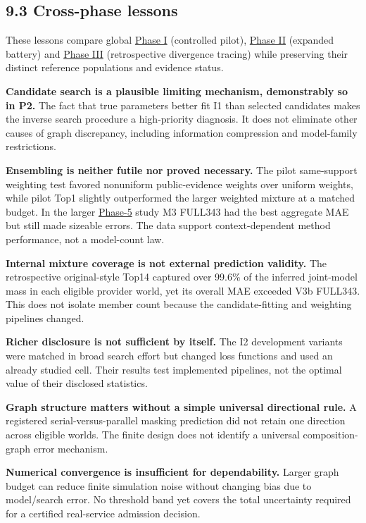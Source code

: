 \documentclass[10pt,a4paper]{article}
\begin{document}
\subsection*{9.3 Cross-phase lessons}

These lessons compare global \hyperref[app:experiment-stages]{Phase I} (controlled pilot), \hyperref[app:experiment-stages]{Phase II} (expanded battery) and \hyperref[app:experiment-stages]{Phase III} (retrospective divergence tracing) while preserving their distinct reference populations and evidence status.

\textbf{Candidate search is a plausible limiting mechanism, demonstrably so in P2.} The fact that true parameters better fit I1 than selected candidates makes the inverse search procedure a high-priority diagnosis. It does not eliminate other causes of graph discrepancy, including information compression and model-family restrictions.

\textbf{Ensembling is neither futile nor proved necessary.} The pilot same-support weighting test favored nonuniform public-evidence weights over uniform weights, while pilot Top1 slightly outperformed the larger weighted mixture at a matched budget. In the larger \hyperref[app:experiment-stages]{Phase-5} study M3 FULL343 had the best aggregate MAE but still made sizeable errors. The data support context-dependent method performance, not a model-count law.

\textbf{Internal mixture coverage is not external prediction validity.} The retrospective original-style Top14 captured over 99.6\% of the inferred joint-model mass in each eligible provider world, yet its overall MAE exceeded V3b FULL343. This does not isolate member count because the candidate-fitting and weighting pipelines changed.

\textbf{Richer disclosure is not sufficient by itself.} The I2 development variants were matched in broad search effort but changed loss functions and used an already studied cell. Their results test implemented pipelines, not the optimal value of their disclosed statistics.

\textbf{Graph structure matters without a simple universal directional rule.} A registered serial-versus-parallel masking prediction did not retain one direction across eligible worlds. The finite design does not identify a universal composition-graph error mechanism.

\textbf{Numerical convergence is insufficient for dependability.} Larger graph budget can reduce finite simulation noise without changing bias due to model/search error. No threshold band yet covers the total uncertainty required for a certified real-service admission decision.
\end{document}
